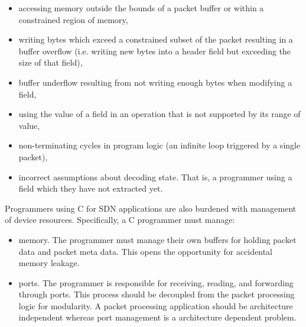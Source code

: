\begin{itemize}
\item accessing memory outside the bounds of a packet buffer or within a constrained
region of memory,

\item writing bytes which exceed a constrained subset of the packet
resulting in a buffer overflow (i.e. writing new bytes into a header field
but exceeding the size of that field),

\item buffer underflow resulting from not writing enough bytes when modifying
a field,

\item using the value of a field in an operation that is not supported by its
range of value,

\item non-terminating cycles in program logic (an infinite loop
triggered by a single packet),

\item incorrect assumptions about decoding state. That is, a programmer using
a field which they have not extracted yet.
\end{itemize}

Programmers using C for SDN applications are also burdened with management of
device resources. Specifically, a C programmer must manage:

\begin{itemize}
\item memory. The programmer must manage their own buffers for holding packet
data and packet meta data. This opens the opportunity for accidental
memory leakage.

\item ports. The programmer is responsible for receiving, reading, and forwarding
through ports. This process should be decoupled from the packet processing logic
for modularity. A packet processing application should be architecture independent
whereas port management is a architecture dependent problem.
\end{itemize}

